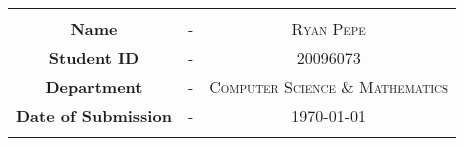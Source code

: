 
\begin{tabular}{|c c c|}
    \hline
    & &\\
    





   
    \large{\textbf{Name }} & - &%
    \large{\textsc{Ryan Pepe}}\\ %
    
    
    \large{\textbf{Student ID}} & - &%
    \large{\textsc{20096073}}\\ %
    
    
    \large{\textbf{Department}} & - &%
    \large{\textsc{Computer Science \& Mathematics}}\\ %
    
    
    \large{\textbf{Date of Submission}} & - &%
    \large{\today}\\ %
    







    & &\\
    \hline
\end{tabular}

